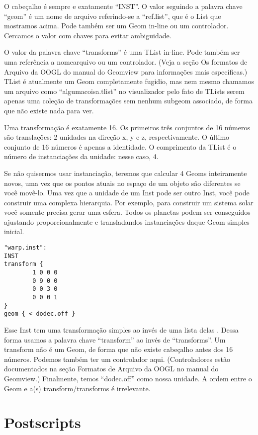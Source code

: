 \documentclass[12pt,a4paper]{book}
\begin{document}
O cabeçalho é sempre e exatamente ``INST''. O valor seguindo a palavra chave
``geom'' é um nome de arquivo referindo-se a ``ref.list'', que é o List que
mostramos acima.  Pode também ser um Geom in-line ou um controlador. Cercamos
o valor com chaves para evitar ambiguidade.

O valor da palavra chave ``transforms'' é uma TList in-line. Pode
também ser uma referência a nomearquivo ou um controlador. (Veja a seção Os formatos de
Arquivo da OOGL do manual do Geomview para informações mais específicas.) TList é atualmente um
Geom completamente fugidio, mas nem mesmo chamamos um arquivo como ``algumacoisa.tlist'' no
visualizador pelo fato de TLists serem apenas uma coleção de transformações sem nenhum
subgeom associado, de forma que não existe nada para ver.

Uma transformação é exatamente 16. Os primeiros três conjuntos de 16 números são translações:
2 unidades na direção x, y e z, respectivamente. O último conjunto de 16 números é apenas
a identidade. O comprimento da TList é o número de instanciações da unidade: nesse caso, 4.

Se não quisermos usar instanciação, teremos que calcular 4
Geoms inteiramente novos, uma vez que os pontos atuais no espaço de um objeto são
diferentes se você movê-lo. Uma vez que a unidade de um Inst pode ser outro
Inst, você pode construir uma complexa hierarquia. Por exemplo, para construir um
sistema solar você somente precisa gerar uma esfera. Todos os planetas podem ser
conseguidos ajustando proporcionalmente e transladandos instanciações daque Geom simples inicial.

\begin{verbatim}
"warp.inst":
INST
transform {
		1 0 0 0
		0 9 0 0
		0 0 3 0
		0 0 0 1
}
geom { < dodec.off }
\end{verbatim}

Esse Inst tem uma transformação simples ao invés de uma lista delas . Dessa forma
usamos a palavra chave ``transform'' ao invés de ``transforms''. Um transform não
é um Geom, de forma que não existe cabeçalho antes dos 16 números. Podemos também
ter um controlador aqui.  (Controladores estão documentados na seção Formatos de Arquivo da
OOGL no manual do Geomview.) Finalmente, temos ``dodec.off'' como nossa
unidade.  A ordem entre o Geom e a(s) transform/transforms é
irrelevante.


\chapter{Postscripts}
\end{document}
